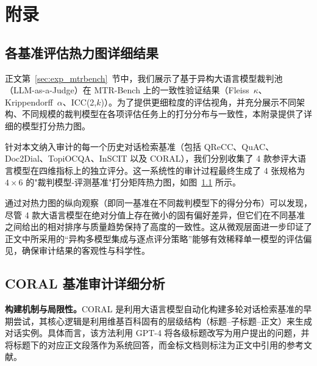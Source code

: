 \chapter[附录]{附\quad 录}%
\appendix %
\section{各基准评估热力图详细结果}
\label{app:heatmap_results}

正文第~\ref{sec:exp_mtrbench}~节中，我们展示了基于异构大语言模型裁判池（LLM-as-a-Judge）在 MTR-Bench 上的一致性验证结果（Fleiss~$\kappa$、Krippendorff~$\alpha$、ICC(2,$k$)）。为了提供更细粒度的评估视角，并充分展示不同架构、不同规模的裁判模型在各项评估任务上的打分分布与一致性，本附录提供了详细的模型打分热力图。

\begin{figure}[htbp]
    \centering
    \label{fig:dataset-heatmeap}
\end{figure}
针对本文纳入审计的每一个历史对话检索基准（包括 QReCC、QuAC、Doc2Dial、TopiOCQA、InSCIT 以及 CORAL），我们分别收集了 4 款参评大语言模型在四维指标上的独立评分。这一系统性的审计过程最终生成了 4 张规格为 $4 \times 6$ 的"裁判模型-评测基准"打分矩阵热力图，如图~\ref{fig:dataset-heatmeap} 所示。

通过对热力图的纵向观察（即同一基准在不同裁判模型下的得分分布）可以发现，尽管 4 款大语言模型在绝对分值上存在微小的固有偏好差异，但它们在不同基准之间给出的相对排序与质量趋势保持了高度的一致性。这从微观层面进一步印证了正文中所采用的“异构多模型集成与逐点评分策略”能够有效稀释单一模型的评估偏见，确保审计结果的客观性与科学性。



\section{CORAL 基准审计详细分析}
\label{app:coral_audit}

\textbf{构建机制与局限性。}CORAL 是利用大语言模型自动化构建多轮对话检索基准的早期尝试，其核心逻辑是利用维基百科固有的层级结构（标题--子标题--正文）来生成对话实例。具体而言，该方法利用 GPT-4 将各级标题改写为用户提出的问题，并将标题下的对应正文段落作为系统回答，而金标文档则标注为正文中引用的参考文献。

